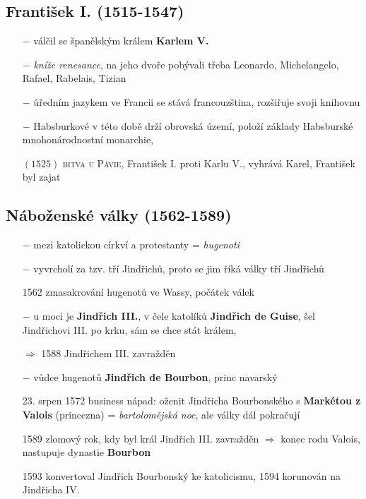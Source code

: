 \documentclass{article}
\begin{document}
\subsection*{František I. (1515-1547)}
\begin{itemize}
    \vspace{-0.5em}
    \setlength\itemsep{0.15em}
    \item[$-$] válčil se španělským králem \textbf{Karlem V.}
    \item[$-$] \textit{kníže renesance}, na jeho dvoře pobývali třeba Leonardo, Michelangelo, Rafael, Rabelais, Tizian
    \item[$-$] úředním jazykem ve Francii se stává francouzština, rozšiřuje svoji knihovnu
    \item[$-$] Habsburkové v této době drží obrovská území, položí základy Habsburské mnohonárodnostní monarchie, 
    \item[$(1525)$]\textsc{bitva u Pávie}, František I. proti Karlu V., vyhrává Karel, František byl zajat
\end{itemize}


\subsection*{Náboženské války (1562-1589)}
\begin{itemize}
    \vspace{-0.5em}
    \setlength\itemsep{0.15em}
    \item[$-$] mezi katolickou církví a protestanty = \textit{hugenoti}
    \item[$-$] vyvrcholí za tzv. tří Jindřichů, proto se jim říká války tří Jindřichů
    \item[1562] zmasakrování hugenotů ve Wassy, počátek válek
    \item[$-$] u moci je \textbf{Jindřich III.}, v čele katolíků \textbf{Jindřich de Guise}, šel Jindřichovi III. po krku, sám se chce stát králem,
    \item[$\Rightarrow$] 1588 Jindřichem III. zavražděn
    \item[$-$] vůdce hugenotů \textbf{Jindřich de Bourbon}, princ navarský
    \item[23. srpen 1572] business nápad: oženit Jindřicha Bourbonského s \textbf{Markétou z Valois} (princezna) = \textit{bartolomějská noc}, ale války dál pokračují
    \item[1589] zlomový rok, kdy byl král Jindřich III. zavražděn $\Rightarrow$ konec rodu Valois, nastupuje dynastie \textbf{Bourbon}
    \item[1593] konvertoval Jindřich Bourbonský ke katolicismu, 1594 korunován na Jindřicha IV.
\end{itemize}
\end{document}

